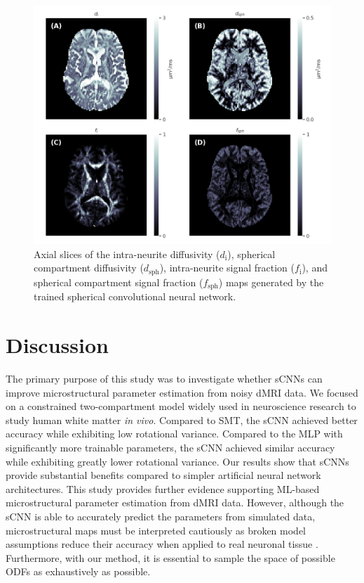 \documentclass[10pt, letterpaper, oneside]{article}
\begin{document}
\begin{figure}
  \centering
  \includegraphics[width=.99\linewidth]{figures/3-compartment-model-maps.png}
  \caption{Axial slices of the intra-neurite diffusivity ($d_\text{i}$), spherical compartment diffusivity ($d_\text{sph}$), intra-neurite signal fraction ($f_\text{i}$), and spherical compartment signal fraction ($f_\text{sph}$) maps generated by the trained spherical convolutional neural network.}
  \label{fig:3-compartment_model_maps}
\end{figure}

\FloatBarrier

\section{Discussion}

The primary purpose of this study was to investigate whether sCNNs can improve microstructural parameter estimation from noisy dMRI data. We focused on a constrained two-compartment model widely used in neuroscience research to study human white matter \textit{in vivo}. Compared to SMT, the sCNN achieved better accuracy while exhibiting low rotational variance. Compared to the MLP with significantly more trainable parameters, the sCNN achieved similar accuracy while exhibiting greatly lower rotational variance. Our results show that sCNNs provide substantial benefits compared to simpler artificial neural network architectures. This study provides further evidence supporting ML-based microstructural parameter estimation from dMRI data. However, although the sCNN is able to accurately predict the parameters from simulated data, microstructural maps must be interpreted cautiously as broken model assumptions reduce their accuracy when applied to real neuronal tissue \citep{lampinen2017neurite, henriques2019microscopic, kerkela2021comparative}. Furthermore, with our method, it is essential to sample the space of possible ODFs as exhaustively as possible.
\end{document}
